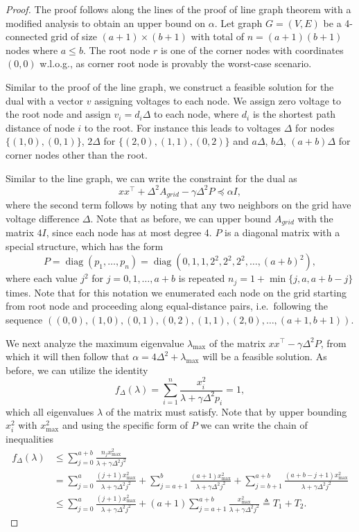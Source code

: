 \documentclass{article}
\DeclareMathOperator{\diag}{diag}
\begin{document}
\begin{proof}
  The proof follows along the lines of the proof of line graph theorem with a modified analysis to obtain an upper bound on $\alpha$. Let graph $G = (V, E)$ be a 4-connected grid of size $(a+1) \times (b+1)$ with total of $n = (a+1)(b+1)$ nodes where $a \leq b$. The root node $r$ is one of the corner nodes with coordinates $(0,0)$ w.l.o.g., as corner root node is provably the worst-case scenario.

  Similar to the proof of the line graph, we construct a feasible solution for the dual with a vector $v$ assigning voltages to each node. We assign zero voltage to the root node and assign $v_i = d_i \Delta$ to each node, where $d_i$ is the shortest path distance of node $i$ to the root. For instance this leads to voltages $\Delta$ for nodes $\{(1,0), (0,1)\}$, $2 \Delta$ for $\{(2,0), (1,1), (0,2)\}$ and $a \Delta$, $b \Delta$, $(a+b) \Delta$ for corner nodes other than the root.

  Similar to the line graph, we can write the constraint for the dual as
  \[ x x^\top + \Delta^2 A_{grid} - \gamma \Delta^2 P \preceq \alpha I, \]
  where the second term follows by noting that any two neighbors on the grid have voltage difference $\Delta$. Note that as before, we can upper bound $A_{grid}$ with the matrix $4 I$, since each node has at most degree 4. $P$ is a diagonal matrix with a special structure, which has the form
  \[ P = \diag(p_1,\ldots,p_n) = \diag\left( 0, 1, 1, 2^2, 2^2, 2^2, \ldots, (a+b)^2 \right), \]
  where each value $j^2$ for $j = 0, 1, \ldots, a+b$ is repeated $n_j = 1 + \min \{ j, a, a+b-j \}$ times.
  Note that for this notation we enumerated each node on the grid starting from root node and proceeding along equal-distance pairs, i.e.\ following the sequence $((0,0), (1,0), (0,1), (0,2), (1,1), (2,0), \ldots, (a+1,b+1))$.

  We next analyze the maximum eigenvalue $\lambda_{\max}$ of the matrix $x x^\top - \gamma \Delta^2 P$, from which it will then follow that $\alpha = 4 \Delta^2 + \lambda_{\max}$ will be a feasible solution. As before, we can utilize the identity
  \[ f_\Delta(\lambda) = \sum_{i=1}^n \frac{x_i^2}{\lambda + \gamma \Delta^2 p_i} = 1, \]
  which all eigenvalues $\lambda$ of the matrix must satisfy. Note that by upper bounding $x_i^2$ with $x_{\max}^2$ and using the specific form of $P$ we can write the chain of inequalities
  \begin{align*}
    f_\Delta(\lambda) & \leq \sum_{j=0}^{a+b} \frac{n_j x_{\max}^2}{\lambda + \gamma \Delta^2 j^2} \\
    & = \sum_{j=0}^{a} \frac{(j+1) x_{\max}^2}{\lambda + \gamma \Delta^2 j^2} + \sum_{j=a+1}^b \frac{(a+1) x_{\max}^2}{\lambda + \gamma \Delta^2 j^2} + \sum_{j=b+1}^{a+b} \frac{(a+b-j+1) x_{\max}^2}{\lambda + \gamma \Delta^2 j^2} \\
    & \leq \sum_{j=0}^{a} \frac{(j+1) x_{\max}^2}{\lambda + \gamma \Delta^2 j^2} + (a+1) \sum_{j=a+1}^{a+b} \frac{x_{\max}^2}{\lambda + \gamma \Delta^2 j^2} \triangleq T_1 + T_2.
  \end{align*}


\end{proof}
\end{document}
